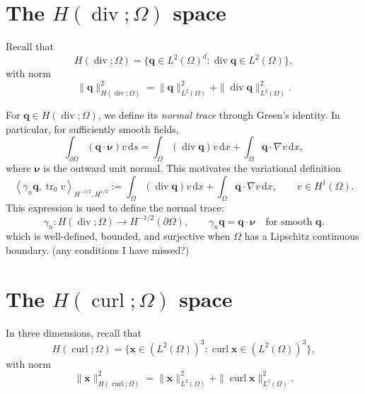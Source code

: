 \documentclass[11pt,a4paper]{article}
\newcommand{\Om}{\Omega}
\newcommand{\dd}{\,\mathrm{d}}
\newcommand{\tr}{\operatorname{tr}}
\newcommand{\Div}{\operatorname{div}}
\newcommand{\Curl}{\operatorname{curl}}
\newcommand{\grad}{\nabla}
\newcommand{\Hdiv}{H(\Div;\Om)}
\newcommand{\Hcurl}{H(\Curl;\Om)}
\newcommand{\dual}[2]{\left\langle #1,#2\right\rangle}
\begin{document}
\section{The \texorpdfstring{$H(\Div;\Om)$}{H(div)} space}

Recall that
\[
    \Hdiv
    =\bigl\{\mathbf q\in L^2(\Om)^d:
                   \Div\mathbf q\in L^2(\Om)\bigr\},
\]
with norm
\[
    \|\mathbf q\|_{H(\Div;\Om)}^2
    =\|\mathbf q\|_{L^2(\Om)}^2
     +\|\Div\mathbf q\|_{L^2(\Om)}^2.
\]

For $\mathbf q\in\Hdiv$, we define its \emph{normal trace} through Green's
identity. In particular, for sufficiently smooth fields,
\[
    \int_{\partial\Om}(\mathbf q\cdot\boldsymbol\nu)v\dd s
    =\int_\Om(\Div\mathbf q)v\dd x
     +\int_\Om\mathbf q\cdot\grad v\dd x,
\]
where $\boldsymbol\nu$ is the outward unit normal. This motivates the
variational definition
\begin{equation}\label{eq:hdiv-trace}
    \dual{\gamma_n\mathbf q}{\tr_0v}_{H^{-1/2},H^{1/2}}
    :=\int_\Om(\Div\mathbf q)v\dd x
      +\int_\Om\mathbf q\cdot\grad v\dd x,
    \qquad v\in H^1(\Om).
\end{equation}
This expression is used to define the normal trace:
\[
    \gamma_n:\Hdiv\longrightarrow H^{-1/2}(\partial\Om),
    \qquad \gamma_n\mathbf q=\mathbf q\cdot\boldsymbol\nu
    \quad\text{for smooth }\mathbf q.
\]
which is well-defined, bounded, and surjective when $\Omega$ has a Lipschitz continuous boundary. (any conditions I have missed?)


\section{The \texorpdfstring{$H(\Curl;\Om)$}{H(curl)} space}

In three dimensions, recall that
\[
    \Hcurl
    =\bigl\{\mathbf x\in (L^2(\Om))^3:
                   \Curl\mathbf x\in (L^2(\Om))^3\bigr\},
\]
with norm
\[
    \|\mathbf x\|_{H(\Curl;\Om)}^2
     =\|\mathbf x\|_{L^2(\Om)}^2
      +\|\Curl\mathbf x\|_{L^2(\Om)}^2.
\]
\end{document}
